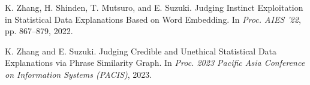 \documentclass[dvipdfmx]{jsarticle}
\begin{document}
\begin{thebibliography}{99}
    K. Zhang, H. Shinden, T. Mutsuro, and E. Suzuki. Judging Instinct Exploitation in Statistical Data Explanations Based on Word Embedding. In \textit{Proc. AIES ’22}, pp. 867–879, 2022.

    K. Zhang and E. Suzuki. Judging Credible and Unethical Statistical Data Explanations via Phrase Similarity Graph. In \textit{Proc. 2023 Pacific Asia Conference on Information Systems (PACIS)}, 2023.
\end{thebibliography}
\end{document}
